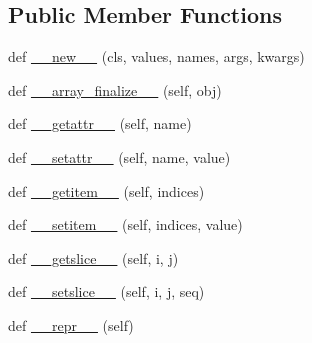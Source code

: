 \subsection*{Public Member Functions}
\begin{DoxyCompactItemize}
\item 
def \mbox{\hyperlink{classpysc2_1_1lib_1_1named__array_1_1_named_numpy_array_a430c1d678e959482fa73622ba8dc276a}{\+\_\+\+\_\+new\+\_\+\+\_\+}} (cls, values, names, args, kwargs)
\item 
def \mbox{\hyperlink{classpysc2_1_1lib_1_1named__array_1_1_named_numpy_array_a2bd5549c57fae992baaa4c99a0e3bcfb}{\+\_\+\+\_\+array\+\_\+finalize\+\_\+\+\_\+}} (self, obj)
\item 
def \mbox{\hyperlink{classpysc2_1_1lib_1_1named__array_1_1_named_numpy_array_a965ef9165993aa61f2a828c2d74d8e2b}{\+\_\+\+\_\+getattr\+\_\+\+\_\+}} (self, name)
\item 
def \mbox{\hyperlink{classpysc2_1_1lib_1_1named__array_1_1_named_numpy_array_ae20f52f3047bba90d9deb658d8145306}{\+\_\+\+\_\+setattr\+\_\+\+\_\+}} (self, name, value)
\item 
def \mbox{\hyperlink{classpysc2_1_1lib_1_1named__array_1_1_named_numpy_array_a2b0e1e4edb82572b308b1144cc1e2835}{\+\_\+\+\_\+getitem\+\_\+\+\_\+}} (self, indices)
\item 
def \mbox{\hyperlink{classpysc2_1_1lib_1_1named__array_1_1_named_numpy_array_a5731267b4680b51ed45c4ecd3255dbf0}{\+\_\+\+\_\+setitem\+\_\+\+\_\+}} (self, indices, value)
\item 
def \mbox{\hyperlink{classpysc2_1_1lib_1_1named__array_1_1_named_numpy_array_a3b773f155fcf8ff1a25074f7e44b1f90}{\+\_\+\+\_\+getslice\+\_\+\+\_\+}} (self, i, j)
\item 
def \mbox{\hyperlink{classpysc2_1_1lib_1_1named__array_1_1_named_numpy_array_a8642b7f0cc04d088f9e46ddf375cee65}{\+\_\+\+\_\+setslice\+\_\+\+\_\+}} (self, i, j, seq)
\item 
def \mbox{\hyperlink{classpysc2_1_1lib_1_1named__array_1_1_named_numpy_array_a60a056d2104ac21e599185e1f5da7367}{\+\_\+\+\_\+repr\+\_\+\+\_\+}} (self)
\end{DoxyCompactItemize}


